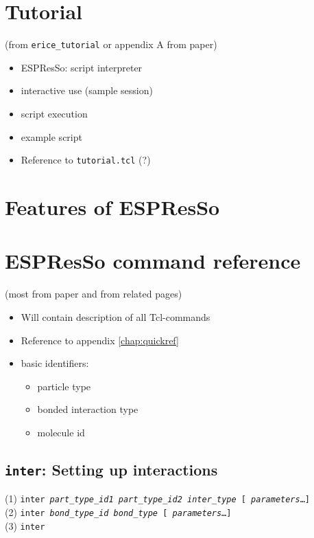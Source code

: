 \documentclass[
a4paper,                        %
11pt,                           %
twoside,                        %
footsepline,                    %
headsepline,                    %
headexclude,                    %
footexclude,                    %
pagesize,                       %
bibtotocnumbered,               %
idxtotoc                        %
]{scrreprt}
\newcommand{\es}{\textsf{ESPResSo}}
\newcommand{\variant}[2]{(#1) \texttt{#2}\\}
\newcommand{\var}[1]{\textrm{\textit{#1}}}
\newenvironment{syntax}{%
  \begin{Sbox}
    \begin{minipage}{0.9\linewidth}
    }{%
    \end{minipage}
  \end{Sbox}
  \begin{center}
    \fbox{\TheSbox}
  \end{center}
}
\begin{document}


\chapter{Tutorial}
\label{chap:tutorial}

(from \verb!erice_tutorial! or appendix A from paper)

\begin{itemize}
\item \es: script interpreter
\item interactive use (sample session)
\item script execution
\item example script
\item Reference to \verb!tutorial.tcl! (?)
\end{itemize}

\chapter{Features of \es{}}
\label{chap:features}

\chapter{\es{} command reference}
\label{chap:ref}

(most from paper and from related pages)

\begin{itemize}
\item Will contain description of all Tcl-commands
\item Reference to appendix \vref{chap:quickref}
\item basic identifiers:
  \begin{itemize}
  \item particle type
  \item bonded interaction type
  \item molecule id
  \end{itemize}
\end{itemize}


\section{\texttt{inter}: Setting up interactions}
\label{sec:inter}
\begin{syntax}
  \variant{1}
  {inter 
    \var{part\_type\_id1} 
    \var{part\_type\_id2}
    \var{inter\_type} 
    [ \var{parameters}\ldots ]
  }
  \variant{2}
  {inter 
    \var{bond\_type\_id} \var{bond\_type} [
    \var{parameters}\ldots ]
  }
  \variant{3}
  {inter}
\end{syntax}
\end{document}
